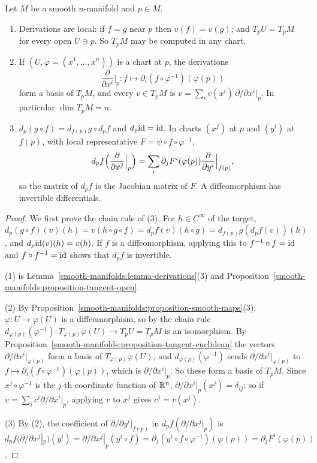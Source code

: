 \begin{proposition}\label{smooth-manifolds:proposition-tangent-space}
Let $M$ be a smooth $n$-manifold and $p \in M$.
\begin{enumerate}
\item Derivations are local: if $f = g$ near $p$ then $v(f) = v(g)$; and $T_pU = T_pM$ for every open $U \ni p$. So $T_pM$ may be computed in any chart.
\item If $(U, \varphi = (x^1, \ldots, x^n))$ is a chart at $p$, the derivations
\[
\frac{\partial}{\partial x^i}\Big|_p \colon f \mapsto \partial_i(f \circ \varphi^{-1})(\varphi(p))
\]
form a basis of $T_pM$, and every $v \in T_pM$ is $v = \sum_iv(x^i)\,\partial/\partial x^i|_p$. In particular $\dim T_pM = n$.
\item $d_p(g \circ f) = d_{f(p)}g \circ d_pf$ and $d_p\mathrm{id} = \mathrm{id}$. In charts $(x^j)$ at $p$ and $(y^i)$ at $f(p)$, with local representative
$F = \psi \circ f \circ \varphi^{-1}$,
\[
d_pf\Bigl(\frac{\partial}{\partial x^j}\Big|_p\Bigr) = \sum_i\partial_jF^i(\varphi(p))\frac{\partial}{\partial y^i}\Big|_{f(p)},
\]
so the matrix of $d_pf$ is the Jacobian matrix of $F$. A diffeomorphism has invertible differentials.
\end{enumerate}
\end{proposition}

\begin{proof}
We first prove the chain rule of (3). For $h \in C^\infty$ of the target, $d_p(g \circ f)(v)(h) = v(h \circ g \circ f) = d_pf(v)(h \circ g) =
d_{f(p)}g(d_pf(v))(h)$, and $d_p\mathrm{id}(v)(h) = v(h)$. If $f$ is a diffeomorphism, applying this to $f^{-1} \circ f = \mathrm{id}$ and $f \circ f^{-1} = \mathrm{id}$ shows that
$d_pf$ is invertible.

(1) is Lemma~\ref{smooth-manifolds:lemma-derivations}(3) and Proposition~\ref{smooth-manifolds:proposition-tangent-open}.

(2) By Proposition~\ref{smooth-manifolds:proposition-smooth-maps}(3), $\varphi \colon U \to \varphi(U)$ is a diffeomorphism, so by the chain rule
$d_{\varphi(p)}(\varphi^{-1}) \colon T_{\varphi(p)}\varphi(U) \to T_pU = T_pM$ is an isomorphism. By
Proposition~\ref{smooth-manifolds:proposition-tangent-euclidean} the vectors $\partial/\partial x^i|_{\varphi(p)}$ form a basis of $T_{\varphi(p)}\varphi(U)$, and
$d_{\varphi(p)}(\varphi^{-1})$ sends $\partial/\partial x^i|_{\varphi(p)}$ to $f \mapsto \partial_i(f \circ \varphi^{-1})(\varphi(p))$, which is
$\partial/\partial x^i|_p$. So these form a basis of $T_pM$. Since $x^j \circ \varphi^{-1}$ is the $j$-th coordinate function of $\mathbb{R}^n$,
$\partial/\partial x^i|_p(x^j) = \delta_{ij}$; so if $v = \sum_ic^i\partial/\partial x^i|_p$, applying $v$ to $x^j$ gives $c^j = v(x^j)$.

(3) By (2), the coefficient of $\partial/\partial y^i|_{f(p)}$ in $d_pf(\partial/\partial x^j|_p)$ is
$d_pf(\partial/\partial x^j|_p)(y^i) = \partial/\partial x^j|_p(y^i \circ f) = \partial_j(y^i \circ f \circ \varphi^{-1})(\varphi(p)) = \partial_jF^i(\varphi(p))$.
\end{proof}

